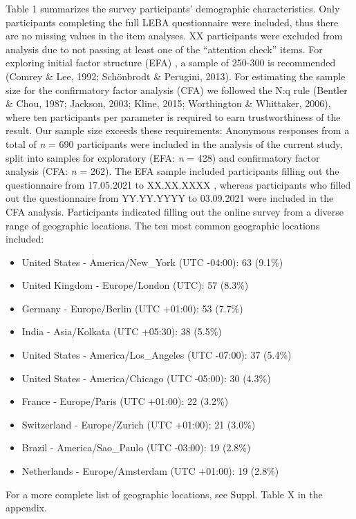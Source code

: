 \documentclass[
  english,
  man]{apa6}
\providecommand{\tightlist}{%
  \setlength{\itemsep}{0pt}\setlength{\parskip}{0pt}}
\begin{document}
Table 1 summarizes the survey participants' demographic characteristics. Only participants completing the full LEBA questionnaire were included, thus there are no missing values in the item analyses. XX participants were excluded from analysis due to not passing at least one of the ``attention check'' items. For exploring initial factor structure (EFA) , a sample of 250-300 is recommended (Comrey \& Lee, 1992; Schönbrodt \& Perugini, 2013). For estimating the sample size for the confirmatory factor analysis (CFA) we followed the N:q rule (Bentler \& Chou, 1987; Jackson, 2003; Kline, 2015; Worthington \& Whittaker, 2006), where ten participants per parameter is required to earn trustworthiness of the result. Our sample size exceeds these requirements: Anonymous responses from a total of \emph{n} = 690 participants were included in the analysis of the current study, split into samples for exploratory (EFA: \emph{n} = 428) and confirmatory factor analysis (CFA: \emph{n} = 262). The EFA sample included participants filling out the questionnaire from 17.05.2021 to XX.XX.XXXX , whereas participants who filled out the questionnaire from YY.YY.YYYY to 03.09.2021 were included in the CFA analysis. Participants indicated filling out the online survey from a diverse range of geographic locations. The ten most common geographic locations included:

\begin{itemize}
\tightlist
\item
  United States - America/New\_York (UTC -04:00): 63 (9.1\%)
\item
  United Kingdom - Europe/London (UTC): 57 (8.3\%)
\item
  Germany - Europe/Berlin (UTC +01:00): 53 (7.7\%)
\item
  India - Asia/Kolkata (UTC +05:30): 38 (5.5\%)
\item
  United States - America/Los\_Angeles (UTC -07:00): 37 (5.4\%)
\item
  United States - America/Chicago (UTC -05:00): 30 (4.3\%)
\item
  France - Europe/Paris (UTC +01:00): 22 (3.2\%)
\item
  Switzerland - Europe/Zurich (UTC +01:00): 21 (3.0\%)
\item
  Brazil - America/Sao\_Paulo (UTC -03:00): 19 (2.8\%)
\item
  Netherlands - Europe/Amsterdam (UTC +01:00): 19 (2.8\%)
\end{itemize}

For a more complete list of geographic locations, see Suppl. Table X in the appendix.
\end{document}
